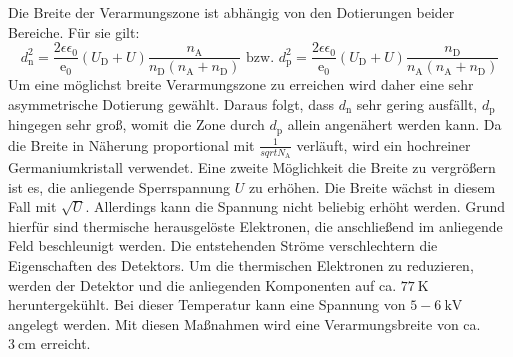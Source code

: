 Die Breite der Verarmungszone ist abhängig von den Dotierungen beider Bereiche. Für sie gilt:
\begin{equation}
    d_\text{n}^2 = \frac{2 \epsilon \epsilon_0}{\text{e}_0} (U_\text{D} + U) \frac{n_\text{A}}{n_\text{D}(n_\text{A}+n_\text{D})} \text{ bzw. } d_\text{p}^2 = \frac{2\epsilon \epsilon _0}{\text{e}_0} (U_\text{D} + U) \frac{n_\text{D}}{n_\text{A}(n_\text{A}+n_\text{D})}
\end{equation}
 Um eine möglichst breite Verarmungszone zu erreichen wird daher eine sehr asymmetrische Dotierung gewählt. Daraus folgt, dass $d_\text{n}$ sehr gering ausfällt, $d_\text{p}$ hingegen sehr groß, womit die Zone durch $d_\text{p}$ allein angenähert werden kann. Da die Breite in Näherung proportional mit $\frac{1}{sqrt{N_\text{A}}}$ verläuft, wird ein hochreiner Germaniumkristall verwendet. Eine zweite Möglichkeit die Breite zu vergrößern ist es, die anliegende Sperrspannung $U$ zu erhöhen. Die Breite wächst in diesem Fall mit $\sqrt{U}$. Allerdings kann die Spannung nicht beliebig erhöht werden. Grund hierfür sind thermische herausgelöste Elektronen, die anschließend im anliegende Feld beschleunigt werden. Die entstehenden Ströme verschlechtern die Eigenschaften des Detektors. Um die thermischen Elektronen zu reduzieren, werden der Detektor und die anliegenden Komponenten auf ca. $\SI{77}{\kelvin}$ heruntergekühlt. Bei dieser Temperatur kann eine Spannung von $5-\SI{6}{\kilo\volt}$ angelegt werden. Mit diesen Maßnahmen wird eine Verarmungsbreite von ca. $\SI{3}{\centi\meter}$ erreicht.
 
